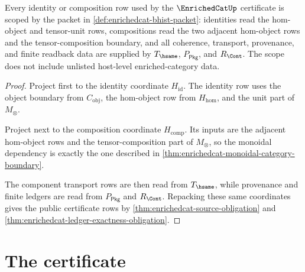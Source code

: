\begin{theorem}\label{thm:enrichedcat-tensor-composition-scope}
Every identity or composition row used by the $\EnrichedCatUp$ certificate is
scoped by the packet in \autoref{def:enrichedcat-bhist-packet}: identities read
the hom-object and tensor-unit rows, compositions read the two adjacent
hom-object rows and the tensor-composition boundary, and all coherence,
transport, provenance, and finite readback data are supplied by
$T_{\hsame}$, $P_{\mathsf{Pkg}}$, and $R_{\Cont}$. The scope does not include
unlisted host-level enriched-category data.
\end{theorem}
\begin{proof}
Project first to the identity coordinate $H_{\mathrm{id}}$. The identity row
uses the object boundary from $C_{\mathrm{obj}}$, the hom-object row from
$H_{\mathrm{hom}}$, and the unit part of $M_{\otimes}$.

Project next to the composition coordinate $H_{\mathrm{comp}}$. Its inputs are
the adjacent hom-object rows and the tensor-composition part of
$M_{\otimes}$, so the monoidal dependency is exactly the one described in
\autoref{thm:enrichedcat-monoidal-category-boundary}.

The component transport rows are then read from $T_{\hsame}$, while provenance
and finite ledgers are read from $P_{\mathsf{Pkg}}$ and $R_{\Cont}$. Repacking
these same coordinates gives the public certificate rows by
\autoref{thm:enrichedcat-source-obligation} and
\autoref{thm:enrichedcat-ledger-exactness-obligation}.
\end{proof}

\section{The certificate}
\label{sec:enrichedcat-certificate}

